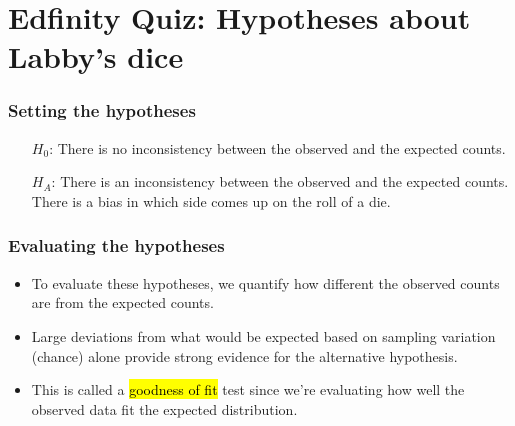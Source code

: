 \documentclass[slidestop,compress,mathserif]{beamer}
\begin{document}

\section{Edfinity Quiz: Hypotheses about Labby's dice}  %


\begin{frame}
\frametitle{Setting the hypotheses}


\pause

\begin{itemize}
\item[$H_0$:] There is no inconsistency between the observed and the expected counts. 

\pause

\item[$H_A$:] There is an inconsistency between the observed and the expected counts.  There is a bias in which side comes up on the roll of a die.
\end{itemize}

\end{frame}


\begin{frame}
\frametitle{Evaluating the hypotheses}

\begin{itemize}

\item To evaluate these hypotheses, we quantify how different the observed counts are from the expected counts. 

\pause

\item Large deviations from what would be expected based on sampling variation (chance) alone provide strong evidence for the alternative hypothesis.

\pause

\item This is called a \hl{goodness of fit} test since we're evaluating how well the observed data fit the expected distribution.

\end{itemize}

\end{frame}
\end{document}

